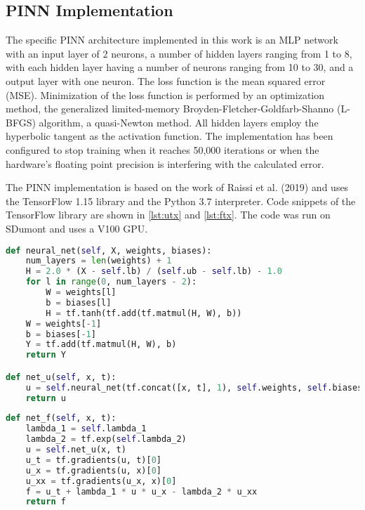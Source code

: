 \documentclass[conference]{IEEEtran}
\begin{document}
\subsection{PINN Implementation}

The specific PINN architecture implemented in this work is an MLP network with an input layer of 2 neurons, a number of hidden layers ranging from 1 to 8, with each hidden layer having a number of neurons ranging from 10 to 30, and a output layer with one neuron. The loss function is the mean squared error (MSE). Minimization of the loss function is performed by an optimization method, the generalized limited-memory Broyden-Fletcher-Goldfarb-Shanno (L-BFGS) algorithm, a quasi-Newton method. All hidden layers employ the hyperbolic tangent as the activation function. The implementation has been configured to stop training when it reaches 50,000 iterations or when the hardware's floating point precision is interfering with the calculated error.

The PINN implementation is based on the work of Raissi et al. (2019) \cite{Raissi2019} and uses the TensorFlow 1.15 library and the Python 3.7 interpreter. Code snippets of the TensorFlow library are shown in \autoref {lst:utx} and \autoref {lst:ftx}. The code was run on SDumont and uses a V100 GPU. 

\begin{lstlisting}[language=Python, label=lst:utx, caption={Code snippet that implements $u(t,x)$}]
def neural_net(self, X, weights, biases):
	num_layers = len(weights) + 1
	H = 2.0 * (X - self.lb) / (self.ub - self.lb) - 1.0
	for l in range(0, num_layers - 2):
		W = weights[l]
		b = biases[l]
		H = tf.tanh(tf.add(tf.matmul(H, W), b))
	W = weights[-1]
	b = biases[-1]
	Y = tf.add(tf.matmul(H, W), b)
	return Y

def net_u(self, x, t):
	u = self.neural_net(tf.concat([x, t], 1), self.weights, self.biases)
	return u
\end{lstlisting}

\begin{lstlisting}[language=Python, label=lst:ftx, caption={Code snippet that implements $f(t,x)$}]
def net_f(self, x, t):
	lambda_1 = self.lambda_1
	lambda_2 = tf.exp(self.lambda_2)
	u = self.net_u(x, t)
	u_t = tf.gradients(u, t)[0]
	u_x = tf.gradients(u, x)[0]
	u_xx = tf.gradients(u_x, x)[0]
	f = u_t + lambda_1 * u * u_x - lambda_2 * u_xx
	return f
\end{lstlisting}
\end{document}
